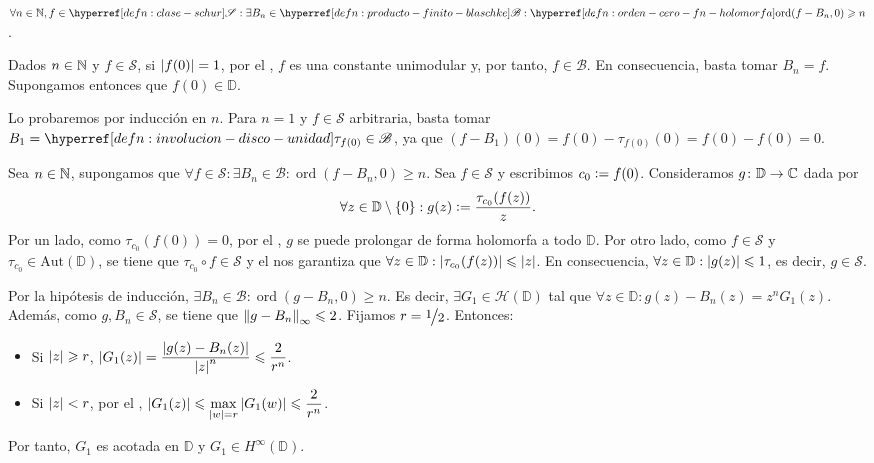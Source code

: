 \begin{lem}\label{lem:aprox-clase-schur-prod-finito-blaschke-orden-cero}
    $\forall n \in \N, f \in \exhyperref[defn:clase-schur]{clase-schur}{\mathscr{S}} : \exists B_n \in \exhyperref[defn:producto-finito-blaschke]{producto-finito-blaschke}{\mathscr{B}} : \exhyperref[defn:orden-cero-fn-holomorfa]{orden-cero-fn-holomorfa}{\operatorname{ord}}(f - B_n, 0) \geq n$.
\end{lem}
\begin{dem}
    Dados $n \in \mathbb{N}$ y $f \in \mathscr{S}$, si $\left|f(0)\right| = 1$, por el , $f$ es una constante unimodular y, por tanto, $f \in \mathscr{B}$. En consecuencia, basta tomar $B_n = f$. Supongamos entonces que $f(0) \in \mathbb{D}$.

    Lo probaremos por inducción en $n$. Para $n = 1$ y $f \in \mathscr{S}$ arbitraria, basta tomar $B_1 = \exhyperref[defn:involucion-disco-unidad]{involucion-disco-unidad}{\tau_{f(0)}} \in \mathscr{B}$, ya que $(f - B_1)(0) = f(0) - \tau_{f(0)}(0) = f(0) - f(0) = 0$.

    Sea $n \in \mathbb{N}$, supongamos que $\forall f \in \mathscr{S} : \exists B_n \in \mathscr{B} : \operatorname{ord}(f - B_n, 0) \geq n$. Sea $f \in \mathscr{S}$ y escribimos $c_0 \vcentcolon= f(0)$. Consideramos $g \colon \mathbb{D} \to \mathbb{C}$ dada por
    \begin{equation}\label{dem:aprox-clase-schur-prod-finito-blaschke-orden-cero:ecu:g}
        \forall z \in \mathbb{D} \setminus \{0\} : g(z) \vcentcolon= \frac{\tau_{c_0}(f(z))}{z}.
    \end{equation}
    Por un lado, como $\tau_{c_0} (f(0)) = 0$, por el , $g$ se puede prolongar de forma holomorfa a todo $\mathbb{D}$. Por otro lado, como $f \in \mathscr{S}$ y $\tau_{c_0} \in \mathrm{Aut} (\mathbb{D})$, se tiene que $\tau_{c_0} \circ f \in \mathscr{S}$ y el  nos garantiza que $\forall z \in \mathbb{D} : \left|\tau_{c_0} (f(z))\right| \leqslant \left|z\right|$. En consecuencia, $\forall z \in \mathbb{D} : \left|g(z)\right| \leqslant 1$, es decir, $g \in \mathscr{S}$.

    Por la hipótesis de inducción, $\exists B_n \in \mathscr{B} : \operatorname{ord}(g - B_n, 0) \geq n$. Es decir, $\exists G_1 \in \mathcal{H}(\mathbb{D})$ tal que $\forall z \in \mathbb{D} : g(z) - B_n(z) = z^n G_1(z)$. Además, como $g, B_n \in \mathscr{S}$, se tiene que $\left\Vert g - B_n\right\Vert_{\infty} \leqslant 2$. Fijamos $r = \sfrac{1}{2}$. Entonces:
    \begin{itemize}
        \item Si $\left|z\right| \geqslant r$, $\displaystyle \left|G_1(z)\right| = \frac{\left|g(z) - B_n(z)\right|}{\left|z\right|^n} \leqslant \frac{2}{r^n}$.
        \item Si $\left|z\right| < r$, por el , $\displaystyle \left|G_1(z)\right| \leqslant \max_{\left|w\right|=r} \left|G_1(w)\right| \leqslant \frac{2}{r^n}$.
    \end{itemize}
    Por tanto, $G_1$ es acotada en $\mathbb{D}$ y $G_1 \in H^\infty\left(\mathbb{D}\right)$.


\end{dem}
